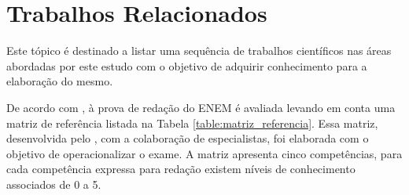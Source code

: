 \section{Trabalhos Relacionados}


Este tópico é destinado a listar uma sequência de trabalhos científicos nas 
áreas abordadas por este estudo com o objetivo de adquirir conhecimento para a
elaboração do mesmo.

De acordo com \cite{silvio_taynan:2017}, à prova de redação do ENEM é avaliada 
levando em conta uma matriz de referência listada na Tabela 
\ref{table:matriz_referencia}. Essa matriz, desenvolvida pelo 
\cite{edital_enem:2016}, com a colaboração de especialistas, foi elaborada com 
o objetivo de operacionalizar o exame. A matriz apresenta cinco competências, 
para cada competência expressa para redação existem níveis de conhecimento 
associados de 0 a 5.

